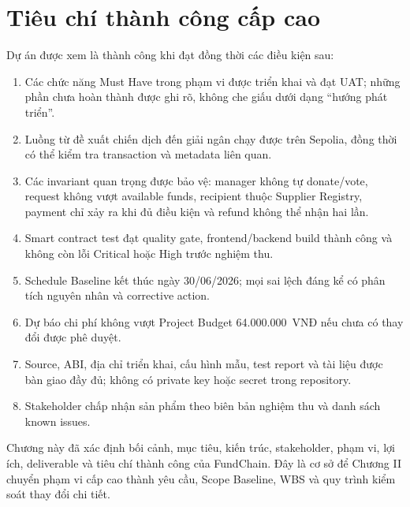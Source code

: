 \section{Tiêu chí thành công cấp cao}

Dự án được xem là thành công khi đạt đồng thời các điều kiện sau:

\begin{enumerate}
  \item Các chức năng Must Have trong phạm vi được triển khai và đạt UAT; những phần chưa hoàn thành được ghi rõ, không che giấu dưới dạng ``hướng phát triển''.
  \item Luồng từ đề xuất chiến dịch đến giải ngân chạy được trên Sepolia, đồng thời có thể kiểm tra transaction và metadata liên quan.
  \item Các invariant quan trọng được bảo vệ: manager không tự donate/vote, request không vượt available funds, recipient thuộc Supplier Registry, payment chỉ xảy ra khi đủ điều kiện và refund không thể nhận hai lần.
  \item Smart contract test đạt quality gate, frontend/backend build thành công và không còn lỗi Critical hoặc High trước nghiệm thu.
  \item Schedule Baseline kết thúc ngày 30/06/2026; mọi sai lệch đáng kể có phân tích nguyên nhân và corrective action.
  \item Dự báo chi phí không vượt Project Budget 64.000.000~VNĐ nếu chưa có thay đổi được phê duyệt.
  \item Source, ABI, địa chỉ triển khai, cấu hình mẫu, test report và tài liệu được bàn giao đầy đủ; không có private key hoặc secret trong repository.
  \item Stakeholder chấp nhận sản phẩm theo biên bản nghiệm thu và danh sách known issues.
\end{enumerate}

Chương này đã xác định bối cảnh, mục tiêu, kiến trúc, stakeholder, phạm vi, lợi ích, deliverable và tiêu chí thành công của FundChain. Đây là cơ sở để Chương II chuyển phạm vi cấp cao thành yêu cầu, Scope Baseline, WBS và quy trình kiểm soát thay đổi chi tiết.
